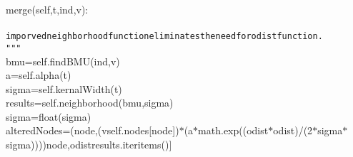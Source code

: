 {{\begin{tabbing}
\hspace{6pt}merge(self,t,ind,v):\\
\\
{\texttt{\hspace{48pt}imporved\hspace{6pt}neighborhood\hspace{6pt}function\hspace{6pt}eliminates\hspace{6pt}the\hspace{6pt}need\hspace{6pt}for\hspace{6pt}odist\hspace{6pt}function.}}\\
{\texttt{\hspace{48pt}\string"}}{\texttt{\string"\string"}}\\
\hspace{48pt}bmu\hspace{6pt}=\hspace{6pt}self.findBMU(ind,v)\\
\hspace{48pt}a\hspace{6pt}=\hspace{6pt}self.alpha(t)\\
\hspace{48pt}sigma\hspace{6pt}=\hspace{6pt}self.kernalWidth(t)\\
\hspace{48pt}results\hspace{6pt}=\hspace{6pt}self.neighborhood(\hspace{6pt}bmu\hspace{6pt},\hspace{6pt}sigma\hspace{6pt})\\
\hspace{48pt}sigma\hspace{6pt}=\hspace{6pt}float(sigma)\\
\hspace{48pt}alteredNodes\hspace{6pt}=\hspace{6pt}{[}(node,(v\dash{}self.nodes{[}node{]})$\ast$(a$\ast$math.exp(\dash{}(odist$\ast$odist)/(2$\ast$sigma$\ast$sigma))))\hspace{6pt}node,odist\hspace{6pt}results.iteritems(){]}\\

\end{tabbing}}}
